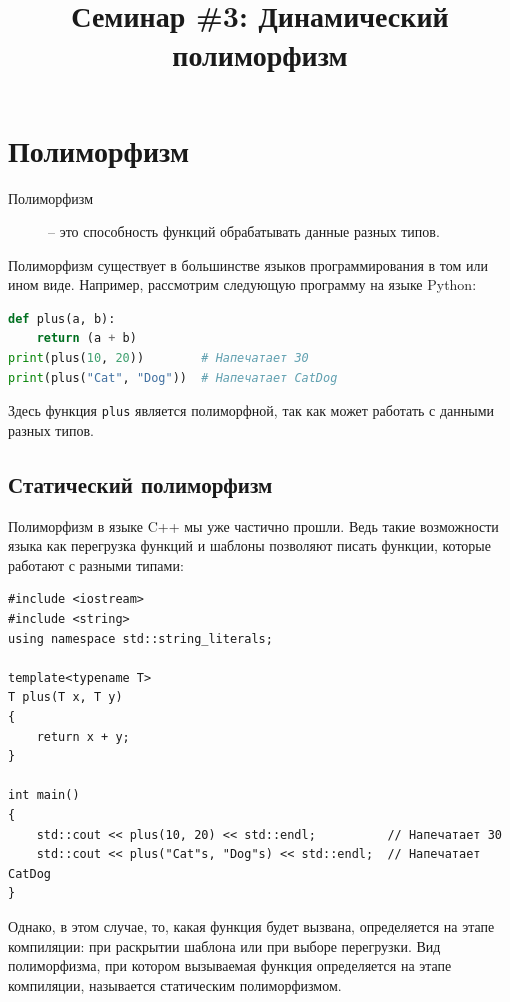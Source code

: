 \documentclass{article}
\begin{document}
\title{Семинар \#3: Динамический полиморфизм \vspace{-5ex}}\date{}\maketitle

\section{Полиморфизм}

\begin{description}
\item[Полиморфизм] -- это способность функций обрабатывать данные разных типов.
\end{description}

\noindent Полиморфизм существует в большинстве языков программирования в том или ином виде. Например, рассмотрим следующую программу на языке Python:
\begin{lstlisting}[language=Python]
def plus(a, b):
    return (a + b)
print(plus(10, 20))        # Напечатает 30
print(plus("Cat", "Dog"))  # Напечатает CatDog
\end{lstlisting}
Здесь функция \texttt{plus} является полиморфной, так как может работать с данными разных типов.

\subsection*{Статический полиморфизм}
Полиморфизм в языке C++ мы уже частично прошли. Ведь такие возможности языка как перегрузка функций и шаблоны позволяют писать функции, которые работают с разными типами:
\begin{lstlisting}[style=csMiptCppStyle]
#include <iostream>
#include <string>
using namespace std::string_literals;

template<typename T>
T plus(T x, T y)
{
	return x + y;
}

int main()
{
	std::cout << plus(10, 20) << std::endl;          // Напечатает 30
	std::cout << plus("Cat"s, "Dog"s) << std::endl;  // Напечатает CatDog
}
\end{lstlisting}
Однако, в этом случае, то, какая функция будет вызвана, определяется на этапе компиляции: при раскрытии шаблона или при выборе перегрузки. Вид полиморфизма, при котором вызываемая функция определяется на этапе компиляции, называется статическим полиморфизмом. 
\end{document}
